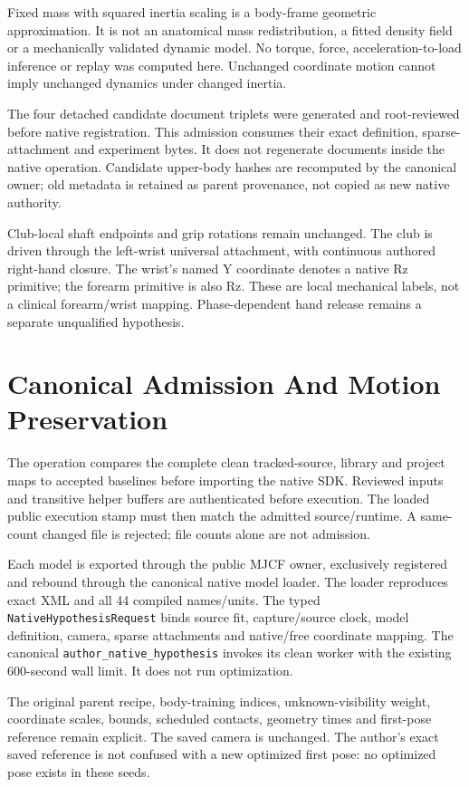 \documentclass[11pt,letterpaper]{article}
\newcommand{\code}[1]{\nolinkurl{#1}}\newcommand{\hash}[1]{{\footnotesize\nolinkurl{#1}}}
\newcommand{\chapterpage}[1]{\clearpage\section{#1}}
\begin{document}
Fixed mass with squared inertia scaling is a body-frame geometric approximation. It is not an anatomical mass redistribution, a fitted density field or a mechanically validated dynamic model. No torque, force, acceleration-to-load inference or replay was computed here. Unchanged coordinate motion cannot imply unchanged dynamics under changed inertia.

The four detached candidate document triplets were generated and root-reviewed before native registration. This admission consumes their exact definition, sparse-attachment and experiment bytes. It does not regenerate documents inside the native operation. Candidate upper-body hashes are recomputed by the canonical owner; old metadata is retained as parent provenance, not copied as new native authority.

Club-local shaft endpoints and grip rotations remain unchanged. The club is driven through the left-wrist universal attachment, with continuous authored right-hand closure. The wrist's named Y coordinate denotes a native Rz primitive; the forearm primitive is also Rz. These are local mechanical labels, not a clinical forearm/wrist mapping. Phase-dependent hand release remains a separate unqualified hypothesis.

\chapterpage{Canonical Admission And Motion Preservation}
The operation compares the complete clean tracked-source, library and project maps to accepted baselines before importing the native SDK. Reviewed inputs and transitive helper buffers are authenticated before execution. The loaded public execution stamp must then match the admitted source/runtime. A same-count changed file is rejected; file counts alone are not admission.

Each model is exported through the public MJCF owner, exclusively registered and rebound through the canonical native model loader. The loader reproduces exact XML and all 44 compiled names/units. The typed \code{NativeHypothesisRequest} binds source fit, capture/source clock, model definition, camera, sparse attachments and native/free coordinate mapping. The canonical \code{author_native_hypothesis} invokes its clean worker with the existing 600-second wall limit. It does not run optimization.

The original parent recipe, body-training indices, unknown-visibility weight, coordinate scales, bounds, scheduled contacts, geometry times and first-pose reference remain explicit. The saved camera is unchanged. The author's exact saved reference is not confused with a new optimized first pose: no optimized pose exists in these seeds.
\end{document}
